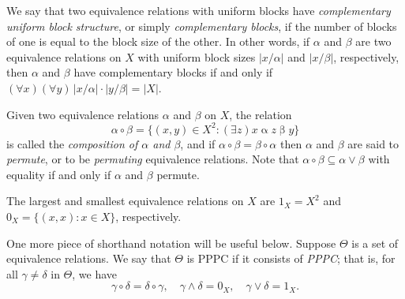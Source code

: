 \documentclass{amsart}
\theoremstyle{plain}
\theoremstyle{definition}
\theoremstyle{definition}
\numberwithin{equation}{section}
\newcommand{\<}{\ensuremath{\langle}}
\renewcommand{\>}{\ensuremath{\rangle}}
\newcommand{\Eq}{\ensuremath{\operatorname{Eq}}}
\newcommand{\ralpha}{\ensuremath{\mathrel{\alpha}}}
\newcommand{\rbeta}{\ensuremath{\mathrel{\beta}}}
\newcommand{\meet}{\ensuremath{\wedge}}
\newcommand{\join}{\ensuremath{\vee}}
\begin{document}
We say that two equivalence relations with uniform
blocks  have 
\emph{complementary uniform block structure}, or simply \emph{complementary
  blocks}, if the number of blocks of one is equal to
the block size of the other. In other words, if $\alpha$ and $\beta$ are two
equivalence relations on $X$ with uniform block sizes $|x/\alpha|$ and
$|x/\beta|$, respectively, then $\alpha$ and $\beta$ have complementary blocks
if and only if $(\forall x)(\forall y)\, |x/\alpha|\cdot |y/\beta| = |X|$.


Given two equivalence relations $\alpha$ and $\beta$ on $X$, the relation
\[
\alpha \circ \beta = \{(x,y) \in X^2: (\exists z)x \ralpha z
\rbeta y\}
\]
is called the \emph{composition of $\alpha$ and $\beta$}, and if 
$\alpha \circ \beta = \beta \circ \alpha$ then $\alpha$ and $\beta$ are said to
\emph{permute}, or to be \emph{permuting} equivalence relations.  
Note that $\alpha \circ \beta \subseteq \alpha \join \beta$ with equality if and
only if $\alpha$ and $\beta$ permute.

The largest and smallest equivalence relations on $X$ are $1_X = X^2$
and $0_X = \{(x,x) : x \in X\}$, respectively.

One more piece of shorthand notation will be useful below.  
Suppose $\Theta$ is a set of equivalence relations.
We say that $\Theta$ is \acs{PPPC} if
it consists of {\it \acl{PPPC}}; that is,
for all $\gamma \neq \delta$ in $\Theta$, we have
\[
\gamma \circ \delta = \delta \circ \gamma,  
\quad  \gamma \meet \delta = 0_X, 
\quad  \gamma \join \delta = 1_X.
\]
\end{document}
